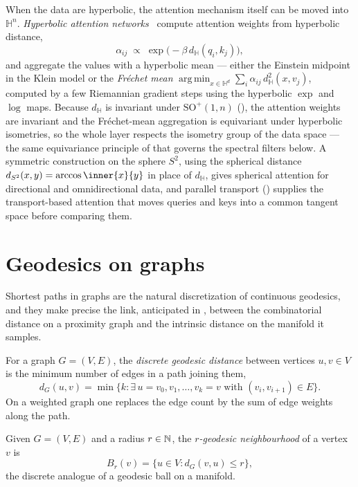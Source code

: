 When the data are hyperbolic, the attention mechanism itself can be moved into
$\mathbb{H}^n$. \emph{Hyperbolic attention
networks}~\citep{gulcehre2019hyperbolic} compute attention weights from
hyperbolic distance,
\[
  \alpha_{ij} \;\propto\; \exp\!\big({-}\beta\, d_{\mathbb{H}}(q_i, k_j)\big),
\]
and aggregate the values with a hyperbolic mean --- either the Einstein midpoint
in the Klein model or the \emph{Fr\'echet mean}
$\operatorname*{arg\,min}_{x \in \mathbb{H}^d} \sum_i \alpha_{ij}\,
d_{\mathbb{H}}^2(x, v_j)$, computed by a few Riemannian gradient steps using the
hyperbolic $\exp$ and $\log$ maps. Because $d_{\mathbb{H}}$ is invariant under
$\mathrm{SO}^+(1,n)$ (), the attention weights
are invariant and the Fr\'echet-mean aggregation is equivariant under
hyperbolic isometries, so the whole layer respects the isometry group of the
data space --- the same equivariance principle of  that governs
the spectral filters below. A symmetric construction on the sphere $S^2$, using
the spherical distance $d_{S^2}(x,y) = \arccos\inner{x}{y}$ in place of
$d_{\mathbb{H}}$, gives spherical attention for directional and omnidirectional
data, and parallel transport () supplies the
transport-based attention that moves queries and keys into a common tangent
space before comparing them.

\section{Geodesics on graphs}
\label{sec:geo:graphs}

Shortest paths in graphs are the natural discretization of continuous geodesics,
and they make precise the link, anticipated in , between the
combinatorial distance on a proximity graph and the intrinsic distance on the
manifold it samples.

\begin{definition}
\label{def:geo:graph-distance}
For a graph $G = (V, E)$, the \emph{discrete geodesic distance} between vertices
$u, v \in V$ is the minimum number of edges in a path joining them,
\[
  d_G(u,v) = \min\{ k : \exists\, u = v_0, v_1, \dots, v_k = v
    \text{ with } (v_i, v_{i+1}) \in E\}.
\]
On a weighted graph one replaces the edge count by the sum of edge weights along
the path.
\end{definition}

\begin{definition}
\label{def:geo:graph-ball}
Given $G = (V, E)$ and a radius $r \in \mathbb{N}$, the \emph{$r$-geodesic
neighbourhood} of a vertex $v$ is
\[
  B_r(v) = \{ u \in V : d_G(v, u) \le r\},
\]
the discrete analogue of a geodesic ball on a manifold.
\end{definition}

